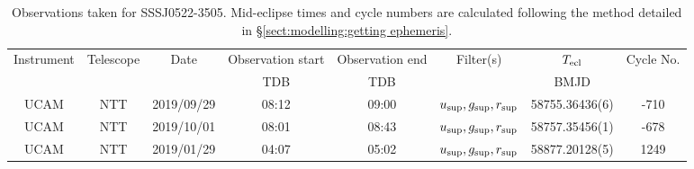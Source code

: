 \begin{table}
	\begin{center}
		\caption{Observations taken for SSSJ0522-3505. Mid-eclipse times and cycle numbers are calculated following the method detailed in \S\ref{sect:modelling:getting ephemeris}.}
		\label{table:observing:observation logs SSSJ0522-3505}
		\begin{tabular}{cccccccc}
			\hline
			Instrument & Telescope & Date & Observation start & Observation end & Filter(s) & $T_{\rm ecl}$ & Cycle No. \\
			 &  &  & TDB & TDB &  & BMJD &  \\
			\hline
			\hline
			UCAM & NTT & 2019/09/29 & 08:12    & 09:00    & $u_{\rm sup},g_{\rm sup},r_{\rm sup}$ & 58755.36436(6)                                                                                                           &                                        -710 \\
			UCAM & NTT & 2019/10/01 & 08:01    & 08:43    & $u_{\rm sup},g_{\rm sup},r_{\rm sup}$ & 58757.35456(1)                                                                                                            &                                        -678 \\
			UCAM & NTT & 2019/01/29 & 04:07    & 05:02    & $u_{\rm sup},g_{\rm sup},r_{\rm sup}$ & 58877.20128(5)                                                                                                            &                                        1249 \\
		   \hline
		\end{tabular}
	\end{center}
\end{table}